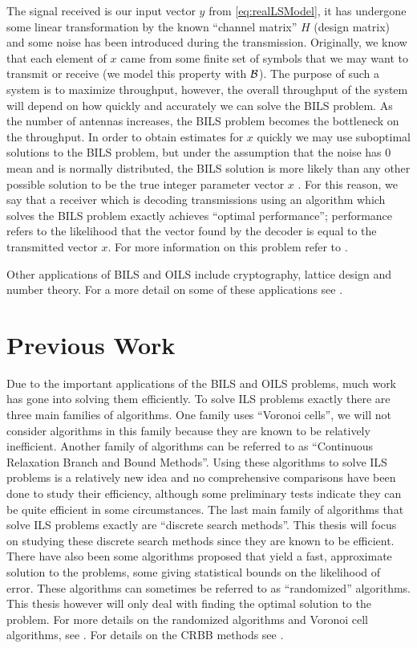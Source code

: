 \documentclass[12pt,Bold,letterpaper]{mcgilletdclass}
\newcommand{\boxcon}{{\cal B}}
\newcommand{\vsp}{\vspace{\baselineskip}}
\begin{document}
The signal received is our input vector $y$ from
\eqref{eq:realLSModel}, it has undergone some linear transformation by the known
``channel matrix'' $H$ (design matrix) and some noise has been introduced during
the transmission. Originally, we know that each element of $x$ came from some
finite set of symbols that we may want to transmit or receive (we model
this property with $\boxcon$). The purpose of such a system is to maximize
throughput, however, the overall throughput of the system will depend on how
quickly and accurately we can solve the BILS problem. As the number of antennas increases, the BILS problem becomes the bottleneck on the throughput. In order to obtain estimates for $x$ quickly we may use suboptimal solutions to the BILS problem, but under the assumption that the noise has $0$ mean and is
normally distributed, the BILS solution is more likely than any other possible
solution to be the true integer parameter vector $x$ \cite{Han11}. For this reason, we say that a receiver which is decoding transmissions using an algorithm which solves the BILS problem exactly achieves ``optimal performance''; performance refers to the likelihood that the vector found by the decoder is equal to the transmitted vector $x$. For more information on this problem refer to \cite{Jan04}.

Other applications of BILS and OILS include cryptography, lattice design and number theory. For a more detail on some of these applications see \cite{HanPS11}.

\vsp \section{Previous Work} \label{sec:prevWork}
Due to the important applications of the BILS and OILS problems, much work has gone into solving them efficiently. To solve ILS problems exactly there are three main families of algorithms. One family uses ``Voronoi cells'', we will not consider algorithms in this family because they are known to be relatively inefficient. Another family of algorithms can be referred to as ``Continuous Relaxation Branch and Bound Methods''. Using these algorithms to solve ILS problems is a relatively new idea and no comprehensive comparisons have been done to study their efficiency, although some preliminary tests indicate they can be quite efficient in some circumstances. The last main family of algorithms that solve ILS problems exactly are ``discrete search methods''. This thesis will focus on studying these discrete search methods since they are known to be efficient. There have also been some algorithms proposed that yield a fast, approximate solution to the problems, some giving statistical bounds on the likelihood of error. These algorithms can sometimes be referred to as ``randomized'' algorithms. This thesis however will only deal with finding the optimal solution to the problem. For more details on the randomized algorithms and Voronoi cell algorithms, see \cite{HansPS11}. For details on the CRBB methods see \cite{Ku11}. 
\end{document}
